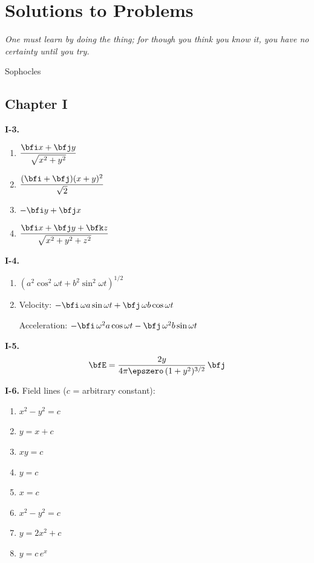 \chapter*{Solutions to Problems}

\epigraph{\itshape One must learn by doing the thing; for though you think you know it, you have no certainty until you try.}{Sophocles}

\section*{Chapter I}

\textbf{I-3.}
\begin{enumerate}[label=(\alph*)]
  \item $\displaystyle \frac{\bfi x + \bfj y}{\sqrt{x^2 + y^2}}$
  \item $\displaystyle \frac{(\bfi + \bfj)(x+y)^2}{\sqrt{2}}$
  \item $-\bfi y + \bfj x$
  \item $\displaystyle \frac{\bfi x + \bfj y + \bfk z}{\sqrt{x^2 + y^2 + z^2}}$
\end{enumerate}

\medskip
\textbf{I-4.}
\begin{enumerate}[label=(\alph*)]
  \item $(a^2\cos^2\omega t + b^2\sin^2\omega t)^{1/2}$
  \item Velocity: $-\bfi\,\omega a\sin\omega t + \bfj\,\omega b\cos\omega t$

        Acceleration: $-\bfi\,\omega^2 a\cos\omega t - \bfj\,\omega^2 b\sin\omega t$
\end{enumerate}

\medskip
\textbf{I-5.}
\[
  \bfE = \frac{2y}{4\pi\epszero\,(1+y^2)^{3/2}}\,\bfj
\]

\medskip
\textbf{I-6.} Field lines ($c$ = arbitrary constant):
\begin{enumerate}[label=(\alph*)]
  \item $x^2 - y^2 = c$
  \item $y = x + c$
  \item $xy = c$
  \item $y = c$
  \item $x = c$
  \item $x^2 - y^2 = c$
  \item $y = 2x^2 + c$
  \item $y = c\,e^x$
\end{enumerate}

